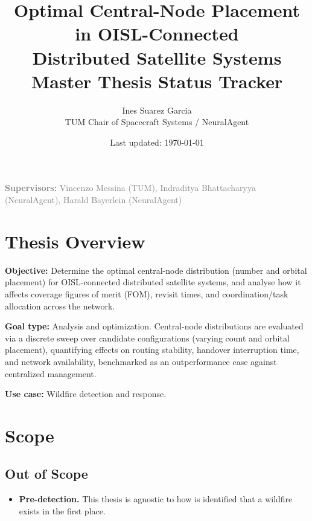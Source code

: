 \documentclass[11pt]{article}
\title{\textbf{Optimal Central-Node Placement in OISL-Connected \\ Distributed Satellite Systems} \\[0.3cm] \large Master Thesis Status Tracker}
\author{Ines Suarez Garcia \\ TUM Chair of Spacecraft Systems / NeuralAgent}
\date{Last updated: \today}
\begin{document}
\maketitle

\begin{center}
\textcolor{gray}{\textbf{Supervisors:} Vincenzo Messina (TUM), Indraditya Bhattacharyya (NeuralAgent), Harald Bayerlein (NeuralAgent)}
\end{center}

\vspace{0.5cm}

\section{Thesis Overview}

\textbf{Objective:} Determine the optimal central-node distribution (number and orbital placement) for OISL-connected distributed satellite systems, and analyse how it affects coverage figures of merit (FOM), revisit times, and coordination/task allocation across the network.

\textbf{Goal type:} Analysis and optimization. Central-node distributions are evaluated via a discrete sweep over candidate configurations (varying count and orbital placement), quantifying effects on routing stability, handover interruption time, and network availability, benchmarked as an outperformance case against centralized management.

\textbf{Use case:} Wildfire detection and response.

\section{Scope}

\subsection{Out of Scope}
\begin{itemize}[leftmargin=1.2cm]
    \item \textbf{Pre-detection.} This thesis is agnostic to how is identified that a wildfire exists in the first place.
\end{itemize}
\end{document}
